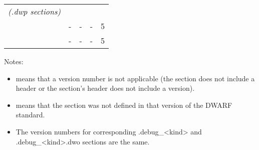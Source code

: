 \begin{centering}
\begin{longtable}{lcccc}
\hspace{3.5cm}\textit{(.dwp sections)}\\
\dotdebugcuindex{}  & - & - & - & 5 \\
\dotdebugtuindex{}  & - & - & - & 5 \\
\end{longtable}
\end{centering}

Notes:
\begin{itemize}
\item  \doublequote{*} means that a version number is not applicable
(the section does not include a header or the section's header does not include a version).
\item  \doublequote{-} means that the section was not defined in that
version of the DWARF standard.
\item  The version numbers for corresponding .debug\_<kind> and .debug\_<kind>.dwo 
sections are the same.
\end{itemize}


